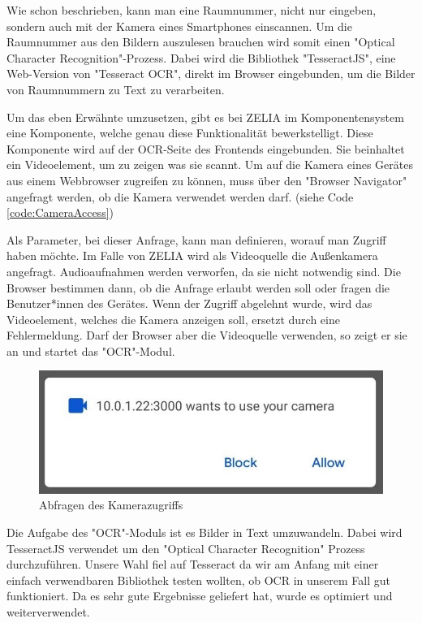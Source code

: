 

Wie schon beschrieben, kann man eine Raumnummer, nicht nur eingeben, sondern auch mit der Kamera eines Smartphones einscannen. Um die Raumnummer aus den Bildern auszulesen brauchen wird somit einen "Optical Character Recognition"-Prozess. Dabei wird die Bibliothek "TesseractJS", eine Web-Version von "Tesseract OCR", direkt im Browser eingebunden, um die Bilder von Raumnummern zu Text zu verarbeiten.\cite{TesseractJS}\cite{TesseractJSImplementation}

Um das eben Erwähnte umzusetzen, gibt es bei ZELIA im Komponentensystem eine Komponente, welche genau diese Funktionalität bewerkstelligt. Diese Komponente wird auf der OCR-Seite des Frontends eingebunden. Sie beinhaltet ein Videoelement, um zu zeigen was sie scannt. Um auf die Kamera eines Gerätes aus einem Webbrowser zugreifen zu können, muss über den "Browser Navigator" angefragt werden, ob die Kamera verwendet werden darf. (siehe Code \ref{code:CameraAccess})


Als Parameter, bei dieser Anfrage, kann man definieren, worauf man Zugriff haben möchte. Im Falle von ZELIA wird als Videoquelle die Außenkamera angefragt. Audioaufnahmen werden verworfen, da sie nicht notwendig sind. Die Browser bestimmen dann, ob die Anfrage erlaubt werden soll oder fragen die Benutzer*innen des Gerätes. Wenn der Zugriff abgelehnt wurde, wird das Videoelement, welches die Kamera anzeigen soll, ersetzt durch eine Fehlermeldung. Darf der Browser aber die Videoquelle verwenden, so zeigt er sie an und startet das "OCR"-Modul.

\begin{figure}[H]
    \centering
    \includegraphics[width=120mm]{media/OCR/cam_access_light.jpg}
    \caption{Abfragen des Kamerazugriffs}
\end{figure}


Die Aufgabe des "OCR"-Moduls ist es Bilder in Text umzuwandeln. Dabei wird TesseractJS verwendet um den "Optical Character Recognition" Prozess durchzuführen. Unsere Wahl fiel auf Tesseract da wir am Anfang mit einer einfach verwendbaren Bibliothek testen wollten, ob OCR in unserem Fall gut funktioniert. Da es sehr gute Ergebnisse geliefert hat, wurde es optimiert und weiterverwendet.

